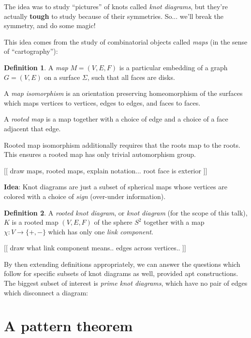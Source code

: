 \documentclass[12pt]{amsart}
\theoremstyle{definition}
\newtheorem*{definition}{Definition}
\theoremstyle{plain}
\begin{document}
The idea was to study ``pictures'' of knots called \emph{knot
  diagrams}, but they're actually \textbf{tough} to study because of
their symmetries. So... we'll break the symmetry, and do some magic!

This idea comes from the study of combinatorial objects called
\emph{maps} (in the sense of ``cartography''):
\begin{definition}
  A \emph{map} $M = (V, E, F)$ is a particular embedding of a graph $G = (V, E)$ on a
  surface $\Sigma$, such that all faces are disks.

  A \emph{map isomorphism} is an orientation preserving homeomorphism of the
  surfaces which maps vertices to vertices, edges to edges, and faces to
  faces.

  A \emph{rooted map} is a map together with a choice of edge and a
  choice of a face adjacent that edge.

  Rooted map isomorphism additionally requires that the roots map to
  the roots. This ensures a rooted map has only trivial automorphism group.
\end{definition}
[[ draw maps, rooted maps, explain notation... root face is exterior ]]

\vspace{2in}

\textbf{Idea}: Knot diagrams are just a subset of spherical maps whose vertices
are colored with a choice of \emph{sign} (over-under information).

\begin{definition}
  A \emph{rooted knot diagram}, or \emph{knot diagram} (for the scope
  of this talk), $K$ is a rooted map $(V, E, F)$ of the sphere $S^2$
  together with a map $\chi: V \to \{+, -\}$ which has only one
  \emph{link component}.
\end{definition}
[[ draw what link component means.. edges across vertices.. ]]

\vspace{1in}

By then extending definitions appropriately, we can answer the
questions which follow for specific subsets of knot diagrams as well,
provided apt constructions. The biggest subset of interest is
\emph{prime knot diagrams}, which have no pair of edges which
disconnect a diagram:

\vspace{1in}

\section{A pattern theorem}
\end{document}
